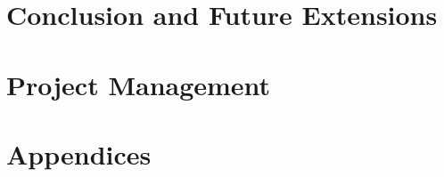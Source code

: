 \documentclass[11pt,a4paper,oneside]{report}
\begin{document}
\chapter{Conclusion and Future Extensions}

\chapter{Project Management}




\nocite{*} %





\chapter{Appendices}
\end{document}
